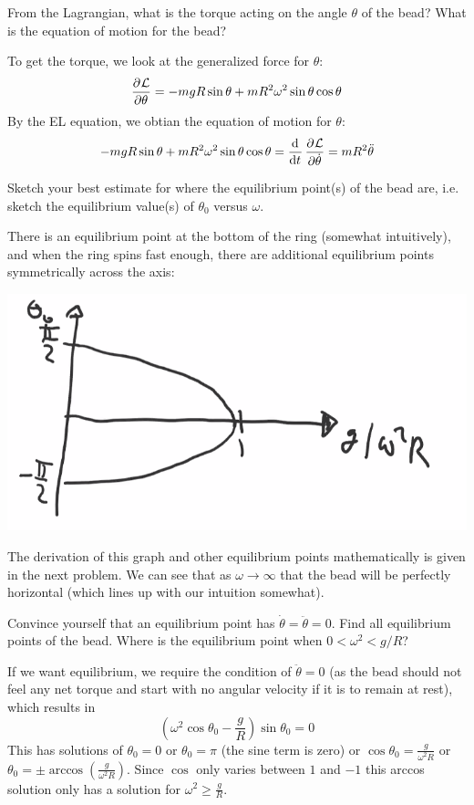 \documentclass[../PHYS306Notes.tex]{subfiles}
\begin{document}
\begin{p}
From the Lagrangian, what is the torque acting on the angle $\theta$ of the bead? What is the equation of motion for the bead?
\end{p}
\begin{s}
To get the torque, we look at the generalized force for $\theta$:
\[\dpd{\LL}{\theta} = -mgR\sin\theta + mR^2\omega^2\sin\theta\cos\theta\]
By the EL equation, we obtian the equation of motion for $\theta$:
\[ -mgR\sin\theta + mR^2\omega^2\sin\theta\cos\theta = \dod{}{t}\dpd{\LL}{\dot{\theta}} = mR^2\ddot{\theta}\]
\end{s}

\begin{p}
Sketch your best estimate for where the equilibrium point(s) of the bead are, i.e. sketch the equilibrium value(s) of $\theta_0$ versus $\omega$.
\end{p}
\begin{s}
There is an equilibrium point at the bottom of the ring (somewhat intuitively), and when the ring spins fast enough, there are additional equilibrium points symmetrically across the axis:
\begin{center}
    \includegraphics[scale=0.4]{Lecture-5/W5-img2.png}
\end{center}
The derivation of this graph and other equilibrium points mathematically is given in the next problem. We can see that as $\omega \rightarrow \infty$ that the bead will be perfectly horizontal (which lines up with our intuition somewhat).
\end{s}

\begin{p}
Convince yourself that an equilibrium point has $\dot{\theta} = \ddot{\theta} = 0$. Find all equilibrium points of the bead. Where is the equilibrium point when $0 < \omega^2 < g/R$?
\end{p}
\begin{s}
If we want equilibrium, we require the condition of $\ddot{\theta} = 0$ (as the bead should not feel any net torque and start with no angular velocity if it is to remain at rest), which results in \[\left(\omega^2\cos\theta_0 - \frac{g}{R}\right)\sin\theta_0 = 0\]
This has solutions of $\theta_0 = 0$ or $\theta_0 = \pi$ (the sine term is zero) or $\cos\theta_0 = \frac{g}{\omega^2R}$ or $\theta_0 = \pm \arccos(\frac{g}{\omega^2R})$. Since $\cos$ only varies between $1$ and $-1$ this arccos solution only has a solution for $\omega^2 \geq \frac{g}{R}$.
\end{s}
\end{document}
